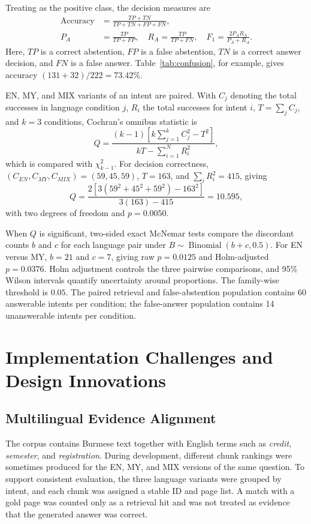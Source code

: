 \documentclass[a4paper,conference]{IEEEtran}
\newcommand{\code}[1]{\texttt{\detokenize{#1}}}
\begin{document}
Treating \code{ABSTAIN} as the positive class, the decision measures are
\begin{align}
\operatorname{Accuracy} & =\frac{TP+TN}{TP+TN+FP+FN},\\
P_A & =\frac{TP}{TP+FP},\quad
R_A=\frac{TP}{TP+FN},\quad
F_1=\frac{2P_AR_A}{P_A+R_A}.
\label{eq:decision-metrics}
\end{align}
Here, $TP$ is a correct abstention, $FP$ is a false abstention, $TN$ is a correct answer decision, and $FN$ is a false answer. Table~\ref{tab:confusion}, for example, gives accuracy $(131+32)/222=73.42\%$.

EN, MY, and MIX variants of an intent are paired. With $C_j$ denoting the total successes in language condition $j$, $R_i$ the total successes for intent $i$, $T=\sum_jC_j$, and $k=3$ conditions, Cochran's omnibus statistic is
\begin{equation}
Q=\frac{(k-1)\left[k\sum_{j=1}^{k}C_j^2-T^2\right]}
{kT-\sum_{i=1}^{N}R_i^2},
\label{eq:cochran-q}
\end{equation}
which is compared with $\chi^2_{k-1}$. For decision correctness, $(C_{EN},C_{MY},C_{MIX})=(59,45,59)$, $T=163$, and $\sum_iR_i^2=415$, giving
\begin{equation}
Q=\frac{2[3(59^2+45^2+59^2)-163^2]}{3(163)-415}
=10.595,
\end{equation}
with two degrees of freedom and $p=0.0050$.

When $Q$ is significant, two-sided exact McNemar tests compare the discordant counts $b$ and $c$ for each language pair under $B\sim\operatorname{Binomial}(b+c,0.5)$. For EN versus MY, $b=21$ and $c=7$, giving raw $p=0.0125$ and Holm-adjusted $p=0.0376$. Holm adjustment controls the three pairwise comparisons, and 95\% Wilson intervals quantify uncertainty around proportions. The family-wise threshold is $0.05$. The paired retrieval and false-abstention population contains 60 answerable intents per condition; the false-answer population contains 14 unanswerable intents per condition.

\section{Implementation Challenges and Design Innovations}
\subsection{Multilingual Evidence Alignment}
The corpus contains Burmese text together with English terms such as \emph{credit}, \emph{semester}, and \emph{registration}. During development, different chunk rankings were sometimes produced for the EN, MY, and MIX versions of the same question. To support consistent evaluation, the three language variants were grouped by intent, and each chunk was assigned a stable ID and page list. A match with a gold page was counted only as a retrieval hit and was not treated as evidence that the generated answer was correct.
\end{document}
